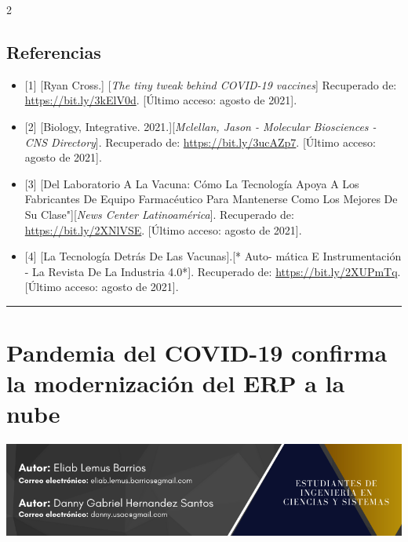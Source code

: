 \documentclass[12pt,spanish,Letterpaper,openany]{book}
\newcommand{\HRule}{\begin{center}\rule{0.5\linewidth}{0.2mm}\end{center}}
\begin{document}
\begin {multicols}{2}
\begin {flushleft}
\begin{minipage}[c]{\columnwidth}
\end{minipage}

\end {flushleft}

\hypertarget{referencias-5}{%
\section{Referencias}\label{referencias-5}}

\begin{itemize}
\item
  {[}1{]} {[}Ryan Cross.{]} {[}\emph{The tiny tweak behind COVID-19 vaccines}{]} Recuperado de: \url{https://bit.ly/3kElV0d}. {[}Último acceso: agosto de 2021{]}.
\item
  {[}2{]} {[}Biology, Integrative. 2021.{]}{[}\emph{Mclellan, Jason - Molecular Biosciences - CNS Directory}{]}.
  Recuperado de: \url{https://bit.ly/3ucAZp7}. {[}Último acceso: agosto de 2021{]}.
\item
  {[}3{]} {[}Del Laboratorio A La Vacuna: Cómo La Tecnología Apoya A Los Fabricantes De Equipo Farmacéutico Para Mantenerse Como Los Mejores De Su Clase"{]}{[}\emph{News Center Latinoamérica}{]}. Recuperado de: \url{https://bit.ly/2XNlVSE}. {[}Último acceso: agosto de 2021{]}.
\item
  {[}4{]} {[}La Tecnología Detrás De Las Vacunas{]}.{[}* Auto-
  mática E Instrumentación - La Revista De La Industria 4.0*{]}. Recuperado de: \url{https://bit.ly/2XUPmTq}. {[}Último acceso: agosto de 2021{]}.
\end{itemize}

\end {multicols}

\medskip

\HRule

\medskip

\hypertarget{pareja58}{%
\chapter{Pandemia del COVID-19 confirma la modernización del ERP a la nube}\label{pareja58}}

\begin{center}\includegraphics[width=1\linewidth]{images/pareja58_01} \end{center}
\end{document}
